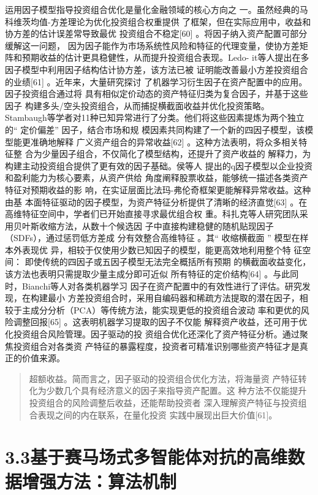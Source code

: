 运用因子模型指导投资组合优化是量化金融领域的核心方向之
一。虽然经典的马科维茨均值-方差理论为优化投资组合权重提供
了框架，但在实际应用中，收益和协方差的估计误差常导致最优
投资组合不稳定{[}60{]} 。将因子纳入资产配置可部分缓解这一问题，
因为因子能作为市场系统性风险和特征的代理变量，使协方差矩
阵和预期收益的估计更具稳健性，从而提升投资组合表现。Ledo-
it等人提出在多因子模型中利用因子结构估计协方差，该方法已被
证明能改善最小方差投资组合的业绩{[}61{]} 。近年来，大量研究探讨
了机器学习衍生因子在资产配置中的应用。因子投资组合通过将
具有相似定价动态的资产特征归类为复合因子，并基于这些因子
构建多头/空头投资组合，从而捕捉横截面收益并优化投资策略。
Stambaugh等学者对11种已知异常进行了分类。他们将这些因素提炼为两个独立的``
定价偏差'' 因子，结合市场和规
模因素共同构建了一个新的四因子模型，该模型能更准确地解释
广义资产组合的异常收益{[}62{]} 。这种方法表明，将众多相关特征整
合为少量因子组合，不仅简化了模型结构，还提升了资产收益的
解释力，为构建主动投资组合提供了更有效的因子基础。侯等人
提出的q因子模型以企业投资和盈利能力为核心要素，从资产供给
角度阐释股票收益，能够统一描述各类资产特征对预期收益的影
响，在实证层面比法玛-弗伦奇框架更能解释异常收益。这种由基
本面特征驱动的因子模型，为资产特征分析提供了清晰的经济直觉{[}63{]}
。在高维特征空间中，学者们已开始直接寻求最优组合权
重。科扎克等人研究团队采用贝叶斯收缩方法，从数十个候选因
子中直接构建稳健的随机贴现因子（SDFs），通过惩罚低方差成
分有效整合高维特征 。其`` 收缩横截面 '' 模型在样本外表现优
异，相较于仅使用少数已知因子的模型，能更高效地利用整个特 征空间：
即使传统的四因子或五因子模型无法完全概括所有预期
的横截面收益变化，该方法也表明只需提取少量主成分即可近似
所有特征的定价结构{[}64{]} 。与此同时，Bianchi等人对各类机器学习
因子在资产配置中的有效性进行了评估。研究发现，在构建最小
方差投资组合时，采用自编码器和稀疏方法提取的潜在因子，相较于主成分分析（PCA）等传统方法，能实现更低的投资组合波动
率和更优的风险调整回报{[}65{]} 。这表明机器学习提取的因子不仅能
解释资产收益，还可用于优化投资组合风险管理。因子驱动的投
资组合优化还深化了资产特征分析。通过聚焦投资组合对各类资
产特征的暴露程度，投资者可精准识别哪些资产特征才是真正的价值来源。

\begin{quote}
超额收益。简而言之，因子驱动的投资组合优化方法，将海量资
产特征转化为少数几个具有经济意义的因子来指导资产配置。这
种方法不仅能提升投资组合的风险调整后收益，还能帮助投资者
深入理解资产特征与投资组合表现之间的内在联系，在量化投资
实践中展现出巨大价值{[}61{]}。
\end{quote}

\section{3.3基于赛马场式多智能体对抗的高维数据增强方法：算法机制}

